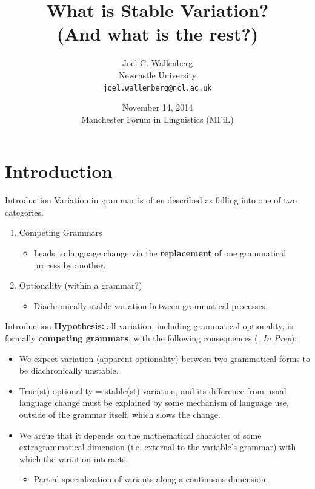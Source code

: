\documentclass[hyperref={pdfpagelabels=false}]{beamer}
\title{What is Stable Variation? \\ (And what is the rest?)}
\author{Joel C. Wallenberg\\Newcastle University\\\texttt{joel.wallenberg@ncl.ac.uk}}
\institute{}
\date[]{November 14, 2014 \\ Manchester Forum in Linguistics (MFiL)}
\begin{document}
\begin{frame}[plain]
\titlepage
\end{frame}


\section{Introduction}
\begin{frame}{Introduction}
	Variation in grammar is often described as falling into one of two categories.
	
	\begin{enumerate}
		\item Competing Grammars
		\begin{itemize}
			\item Leads to language change via the \textbf{replacement} of one grammatical process by another.
		\end{itemize}
		\item Optionality (within a grammar?)
		\begin{itemize}
			\item Diachronically stable variation between grammatical processes.
		\end{itemize}
	\end{enumerate}
	
\end{frame}

\begin{frame}{Introduction}
	\textbf{Hypothesis:} all variation, including grammatical optionality, is formally \textbf{competing grammars}, with the following consequences (\citealt{fruehwaldwallenberg2013}, \textsl{In Prep}): \nocite{fruehwaldwallenberginprep}
	\begin{itemize}
		\item We expect variation (apparent optionality) between two grammatical forms to be diachronically unstable.
		\item True(st) optionality = stable(st) variation, and its difference from usual language change must be explained by some mechanism of language use, outside of the grammar itself, which slows the change. 
		\item We argue that it depends on the mathematical character of some extragrammatical dimension (i.e. external to the variable's grammar) with which the variation interacts.
			\begin{itemize} \item Partial specialization of variants along a continuous dimension. \end{itemize}
	\end{itemize}

\end{frame}
\end{document}
